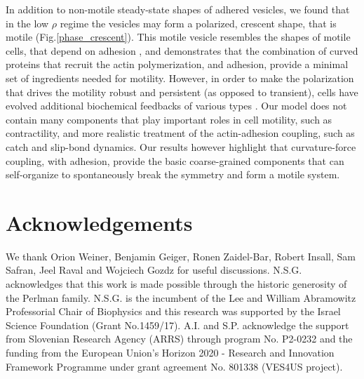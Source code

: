 \documentclass[pre,amsmath]{revtex4}
\begin{document}
In addition to non-motile steady-state shapes of adhered vesicles, we found that in the low $\rho$ regime the vesicles may form a polarized, crescent shape, that is motile (Fig.\ref{phase_crescent}). This motile vesicle resembles the shapes of motile cells, that depend on adhesion \cite{barnhart2017adhesion}, and demonstrates that the combination of curved proteins that recruit the actin polymerization, and adhesion, provide a minimal set of ingredients needed for motility. However, in order to make the polarization that drives the motility robust and persistent (as opposed to transient), cells have evolved additional biochemical feedbacks of various types \cite{ridley2003cell,maiuri2015actin,rappel2017mechanisms}. Our model does not contain many components that play important roles in cell motility, such as contractility, and more realistic treatment of the actin-adhesion coupling, such as catch and slip-bond dynamics. Our results however highlight that curvature-force coupling, with adhesion, provide the basic coarse-grained components that can self-organize to spontaneously break the symmetry and form a motile system.
\section{Acknowledgements}
We thank Orion Weiner, Benjamin Geiger, Ronen Zaidel-Bar, Robert Insall, Sam Safran, Jeel Raval and Wojciech Gozdz for useful discussions. N.S.G. acknowledges that this work is made possible through the historic generosity of the Perlman family. N.S.G. is the incumbent of the Lee and William Abramowitz Professorial Chair of Biophysics and this research was supported by the Israel Science Foundation (Grant No.1459/17). A.I. and S.P. acknowledge the support from Slovenian Research Agency (ARRS) through program No. P2-0232 and the funding from the European Union's Horizon 2020 - Research and Innovation Framework Programme under grant agreement No. 801338 (VES4US project).


\appendix
\renewcommand{\theequation}{A-\arabic{equation}}
\setcounter{equation}{0}
\renewcommand{\thefigure}{A-\arabic{figure}}
\setcounter{figure}{0}
\end{document}
